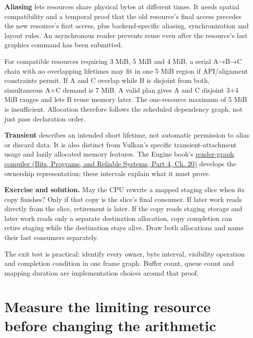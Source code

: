 \textbf{Aliasing} lets resources share physical bytes at different times. It needs spatial compatibility and a temporal proof that the old resource's final access precedes the new resource's first access, plus backend-specific aliasing, synchronization and layout rules. An asynchronous reader prevents reuse even after the resource's last graphics command has been submitted.

For compatible resources requiring 3 MiB, 5 MiB and 4 MiB, a serial A→B→C chain with no overlapping lifetimes may fit in one 5 MiB region if API/alignment constraints permit. If A and C overlap while B is disjoint from both, simultaneous A+C demand is 7 MiB. A valid plan gives A and C disjoint 3+4 MiB ranges and lets B reuse memory later. The one-resource maximum of 5 MiB is insufficient. Allocation therefore follows the scheduled dependency graph, not just pass declaration order.

\textbf{Transient} describes an intended short lifetime, not automatic permission to alias or discard data. It is also distinct from Vulkan's specific transient-attachment usage and lazily allocated memory features. The Engine book's \href{../01-Bits-Programs-and-Reliable-Systems-P04/main.pdf\#06-engine-ii-ch042-from-a-list-of-render-passes-to-a-proved-execution-order}{render-graph compiler (Bits, Programs, and Reliable Systems, Part 4, Ch. 20)} develops the ownership representation; these intervals explain what it must prove.

\textbf{Exercise and solution.} May the CPU rewrite a mapped staging slice when its copy finishes? Only if that copy is the slice's final consumer. If later work reads directly from the slice, retirement is later. If the copy reads staging storage and later work reads only a separate destination allocation, copy completion can retire staging while the destination stays alive. Draw both allocations and name their last consumers separately.

The exit test is practical: identify every owner, byte interval, visibility operation and completion condition in one frame graph. Buffer count, queue count and mapping duration are implementation choices around that proof.

\section{Measure the limiting resource before changing the arithmetic}\label{03-visual-computing-i-ch016-measure-the-limiting-resource-before-changing-the-arithmetic}

